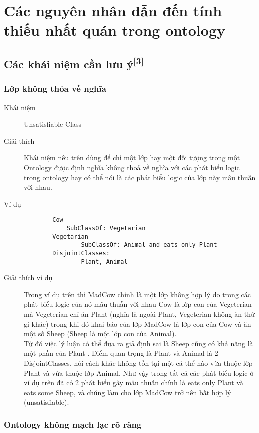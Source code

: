 \chapter{Các nguyên nhân dẫn đến tính thiếu nhất quán  trong ontology}

\section{Các khái niệm cần lưu ý\textsuperscript{[3]}}
\subsection{Lớp không thỏa về nghĩa}
\begin{description}
\item[Khái niệm]	Unsatisfiable Class
\item[Giải thích] Khái niệm nêu trên dùng để chỉ một lớp hay một đối tượng trong một Ontology được định nghĩa không thoả về nghĩa với các phát biểu logic trong ontology hay có thể nói là các phát biểu logic của lớp này mâu thuẫn với nhau.
\item[Ví dụ]
\begin{verbatim}
		Cow
   	 		SubClassOf: Vegetarian
		Vegetarian
    			SubClassOf: Animal and eats only Plant
		DisjointClasses:
    			Plant, Animal
\end{verbatim}
\item[Giải thích ví dụ]
Trong ví dụ trên thì MadCow chính là một lớp không hợp lý do trong các phát biểu logic của nó mâu thuẫn với nhau Cow là lớp con của Vegeterian mà Vegeterian chỉ ăn Plant (nghĩa là ngoài Plant, Vegeterian không ăn thứ gi khác) trong khi đó khai báo của lớp MadCow là lớp con của Cow và ăn một số Sheep (Sheep là một lớp con của Animal).
\\ Từ đó việc lý luận có thể đưa ra giả định sai là Sheep cũng có khả năng là một phần của Plant . Điểm quan trọng là Plant và Animal là 2 DisjointClasses, nói cách khác không tồn tại một cá thể nào vừa thuộc lớp Plant và vừa thuộc lớp Animal. Như vậy trong tất cả các phát biểu logic ở ví dụ trên đã có 2 phát biểu gây mâu thuẫn chính là eats only Plant và eats some Sheep, và chúng làm cho lớp MadCow trở nên bất hợp lý (unsatisfiable).
\end{description}

\subsection{Ontology không mạch lạc rõ ràng}

